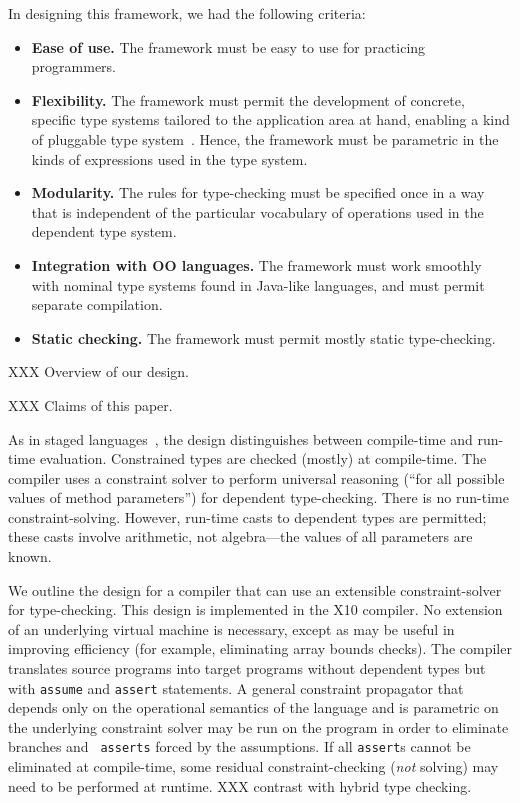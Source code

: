 \documentclass[nocopyrightspace,preprint,9pt]{sigplanconf}
\newcommand\Xten{{X10}}
\begin{document}
In designing this framework, we had the following criteria:
\begin{itemize}
\item 
{\bf Ease of use.}
The framework must be 
easy to use for practicing programmers.

\item
{\bf Flexibility.}
The framework
must permit the development of concrete,
specific type systems tailored to the application area at
hand, enabling a kind of pluggable type system~\cite{bracha04-pluggable}.
Hence, the framework must be parametric in the kinds of
expressions used in the type system.

\item
{\bf Modularity.}
The rules for type-checking
must be specified once in a way that is independent of the
particular vocabulary of operations used in the dependent type
system.

\item
{\bf Integration with OO languages.}
The framework must
work smoothly with nominal type systems found in Java-like
languages, and must permit separate compilation.

\item
{\bf Static checking.}
The framework must permit mostly static type-checking. 
\end{itemize}


XXX Overview of our design.

XXX Claims of this paper.

%
%

As in staged languages~\cite{nielson-multistage,ts97-multistage},
the design distinguishes between
compile-time and run-time evaluation. Constrained types are
checked (mostly) at compile-time.
The compiler uses a
constraint solver to perform universal reasoning (``for all possible
values of method parameters'') for dependent type-checking.  There is
no run-time constraint-solving.  However,
run-time casts to dependent types are
permitted; these casts involve arithmetic, not
algebra---the values of all parameters are known.

We outline the design for a compiler that can use an extensible
constraint-solver for type-checking.
This design is implemented in the \Xten{} compiler.
No extension of an
underlying virtual machine is necessary, except as may be useful in
improving efficiency (for example, eliminating array bounds checks).
The compiler translates source
programs into target programs without dependent types
but with {\tt assume} and {\tt assert} statements.
A general
constraint propagator that depends only on the operational semantics
of the language and is parametric on the underlying constraint solver
may be run on the program in order to eliminate branches and {\tt
asserts} forced by the assumptions. If all {\tt assert}s cannot be
eliminated at compile-time, some residual constraint-checking
({\em not} solving) may need to be performed at runtime.
%
XXX contrast with hybrid type checking.
\end{document}

